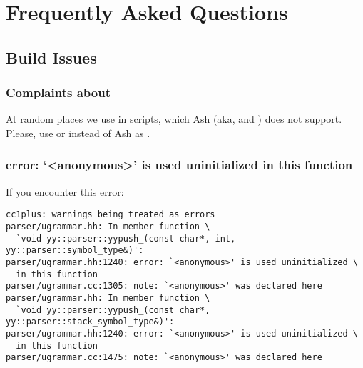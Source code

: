 
\chapter{Frequently Asked Questions}
\label{sec:faq}

\ifx\ifHtml\undefined\else
  \let\subsubsectionSave\subsubsection
  \let\subsubsection\faqsection
\fi

\section{Build Issues}
\label{sec:faq:build}

\subsection{Complaints about \samp{+=}}
At random places we use \samp{+=} in  scripts, which Ash
(aka,  and ) does not support.  Please, use
 or  instead of Ash as .

\subsection{error: `<anonymous>' is used uninitialized in this function}
\label{sec:faq:build:uninitialized}

If you encounter this error:

\begin{lstlisting}[language={}]
cc1plus: warnings being treated as errors
parser/ugrammar.hh: In member function \
  `void yy::parser::yypush_(const char*, int, yy::parser::symbol_type&)':
parser/ugrammar.hh:1240: error: `<anonymous>' is used uninitialized \
  in this function
parser/ugrammar.cc:1305: note: `<anonymous>' was declared here
parser/ugrammar.hh: In member function \
  `void yy::parser::yypush_(const char*, yy::parser::stack_symbol_type&)':
parser/ugrammar.hh:1240: error: `<anonymous>' is used uninitialized \
  in this function
parser/ugrammar.cc:1475: note: `<anonymous>' was declared here
\end{lstlisting}

